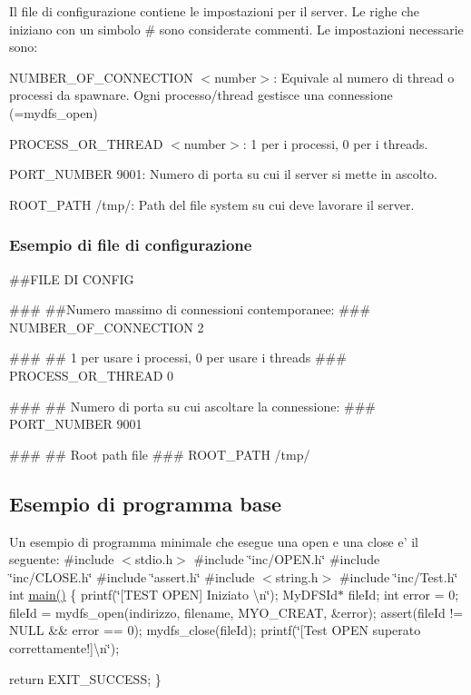 Il file di configurazione contiene le impostazioni per il server. Le righe che iniziano con un simbolo {\ttfamily \#} sono considerate commenti. Le impostazioni necessarie sono\+:


\begin{DoxyItemize}
\item {\ttfamily N\+U\+M\+B\+E\+R\+\_\+\+O\+F\+\_\+\+C\+O\+N\+N\+E\+C\+T\+I\+O\+N $<$number$>$}\+: Equivale al numero di thread o processi da spawnare. Ogni processo/thread gestisce una connessione (=mydfs\+\_\+open)
\item {\ttfamily P\+R\+O\+C\+E\+S\+S\+\_\+\+O\+R\+\_\+\+T\+H\+R\+E\+A\+D $<$number$>$}\+: 1 per i processi, 0 per i threads.
\item {\ttfamily P\+O\+R\+T\+\_\+\+N\+U\+M\+B\+E\+R 9001}\+: Numero di porta su cui il server si mette in ascolto.
\item {\ttfamily R\+O\+O\+T\+\_\+\+P\+A\+T\+H /tmp/}\+: Path del file system su cui deve lavorare il server.
\end{DoxyItemize}

\subsubsection*{Esempio di file di configurazione}

\begin{DoxyVerb}##FILE DI CONFIG

###
##Numero massimo di connessioni contemporanee:
###
NUMBER_OF_CONNECTION 2

###
## 1 per usare i processi, 0 per usare i threads
###
PROCESS_OR_THREAD 0

###
## Numero di porta su cui ascoltare la connessione:
###
PORT_NUMBER 9001

###
## Root path file
###
ROOT_PATH /tmp/
\end{DoxyVerb}


\subsection*{Esempio di programma base}

Un esempio di programma minimale che esegue una open e una close e' il seguente\+: \#include $<$stdio.\+h$>$ \#include \char`\"{}inc/\+O\+P\+E\+N.\+h\char`\"{} \#include \char`\"{}inc/\+C\+L\+O\+S\+E.\+h\char`\"{} \#include \char`\"{}assert.\+h\char`\"{} \#include $<$string.\+h$>$ \#include \char`\"{}inc/\+Test.\+h\char`\"{} int \hyperlink{client_8c_a0ddf1224851353fc92bfbff6f499fa97}{main()} \{ printf(\char`\"{}\mbox{[}\+T\+E\+S\+T O\+P\+E\+N\mbox{]} Iniziato \textbackslash{}n\char`\"{}); My\+D\+F\+S\+Id$\ast$ file\+Id; int error = 0; file\+Id = mydfs\+\_\+open(indirizzo, filename, M\+Y\+O\+\_\+\+C\+R\+E\+A\+T, \&error); assert(file\+Id != N\+U\+L\+L \&\& error == 0); mydfs\+\_\+close(file\+Id); printf(\char`\"{}\mbox{[}\+Test O\+P\+E\+N superato correttamente!\mbox{]}\textbackslash{}n\char`\"{});

return E\+X\+I\+T\+\_\+\+S\+U\+C\+C\+E\+S\+S; \} 